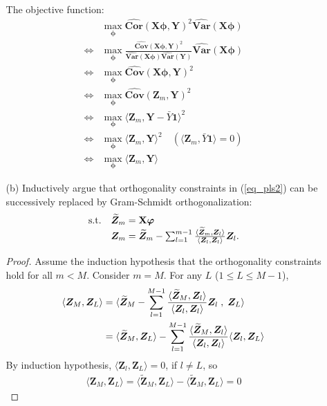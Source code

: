 \documentclass[10pt]{article}
\theoremstyle{definition}
\theoremstyle{remark}
\newcommand{\Xb}{\mathbf{X}}
\newcommand{\bY}{\bm{Y}}
\newcommand{\bZ}{\bm{Z}}
\newcommand{\bphi}{\bm{\phi}}
\newcommand{\bvarphi}{\bm{\varphi}}
\newcommand{\bvar}{\textbf{Var}}
\newcommand{\bcov}{\textbf{Cov}}
\newcommand{\bcor}{\textbf{Cor}}
\begin{document}
\begin{enumerate}
\begin{itemize}[leftmargin=*]
		The objective function:
		\begin{align*}
		    & \max\limits_{\bphi} \widehat{\bcor}(\Xb\bphi,\bY)^{2}\widehat{\bvar}(\Xb\bphi) \\
		    \iff & \max\limits_{\bphi} \frac{\widehat{\bcov}(\Xb\bphi,\bY)^{2}}{\widehat{\bvar}(\Xb\bphi)\widehat{\bvar}(\bY)}\widehat{\bvar}(\Xb\bphi) \\
		    \iff & \max\limits_{\bphi} \widehat{\bcov}(\Xb\bphi,\bY)^{2} \\
		    \iff & \max\limits_{\bphi} \widehat{\bcov}(\bZ_{m},\bY)^{2} \\
		    \iff & \max\limits_{\bphi} \langle \bZ_{m},\bY-\bar{Y}\bm{1} \rangle^{2} \\
		    \iff & \max\limits_{\bphi} \langle \bZ_{m},\bY \rangle^{2} \quad (\langle \bZ_{m},\bar{Y}\bm{1}  \rangle = 0) \\
		    \iff & \max\limits_{\bphi} \langle \bZ_{m},\bY \rangle
		\end{align*}
		
		\item [(b)] Inductively argue that orthogonality constraints in (\ref{eq_pls2}) can be successively replaced by Gram-Schmidt orthogonalization:
		\begin{align}
		\begin{array}{rl}
		\textrm{s.t.}
		&\widetilde{\bZ}_{m} = \Xb\bvarphi\\
		&\bZ_{m} = \widetilde{\bZ}_{m} - \sum_{l=1}^{m-1}{\langle \widetilde{\bZ}_{m}, \bZ_{l} \rangle \over \langle \bZ_{l}, \bZ_{l} \rangle }\bZ_{l}.
		\end{array}\label{eq_pls3}
		\end{align}
		
		\begin{proof}
		Assume the induction hypothesis that the orthogonality constraints hold for all $ m < M $. Consider $ m=M $. For any $L$ ($ 1 \le L \le M-1 $),
		\begin{align*}
		    \langle \bZ_{M}, \bZ_{L} \rangle & = \langle \widetilde{\bZ}_{M} - \sum_{l=1}^{M-1}{\langle \widetilde{\bZ}_{M}, \bZ_{l} \rangle \over \langle \bZ_{l}, \bZ_{l} \rangle }\bZ_{l} \; , \; \bZ_{L} \rangle \\
		    & = \langle \widetilde{\bZ}_{M}, \bZ_{L} \rangle - \sum_{l=1}^{M-1}{\langle \widetilde{\bZ}_{M}, \bZ_{l} \rangle \over \langle \bZ_{l}, \bZ_{l} \rangle }\langle \bZ_{l}, \bZ_{L} \rangle
		\end{align*}
		By induction hypothesis, $ \langle \bZ_{l}, \bZ_{L} \rangle = 0 $, if $ l \ne L $, so
		\begin{align*}
		    \langle \bZ_{M}, \bZ_{L} \rangle  = \langle \widetilde{\bZ}_{M}, \bZ_{L} \rangle - \langle \widetilde{\bZ}_{M}, \bZ_{L} \rangle = 0
		\end{align*}
		\end{proof}
		

\end{itemize}
\end{enumerate}
\end{document}
